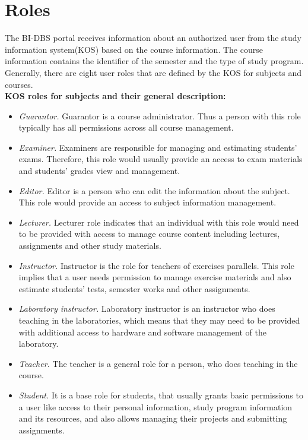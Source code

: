 \section{Roles} The BI-DBS portal receives information about an authorized user from the study information system(KOS) based on the course information. The course information contains the identifier of the semester and the type of study program. Generally, there are eight user roles that are defined by the KOS for subjects and courses.\\

\noindent \textbf{KOS roles for subjects and their general description:}

\begin{itemize}
    \item \emph{Guarantor.} Guarantor is a course administrator. Thus a person with this role typically has all permissions across all course management.
    \item \emph{Examiner.} Examiners are responsible for managing and estimating students' exams. Therefore, this role would usually provide an access to exam materials and students' grades view and management.
    \item \emph{Editor.} Editor is a person who can edit the information about the subject. This role would provide an access to subject information management.
    \item \emph{Lecturer.} Lecturer role indicates that an individual with this role would need to be provided with access to manage course content including lectures, assignments and other study materials.
    \item \emph{Instructor.} Instructor is the role for teachers of exercises parallels. This role implies that a user needs permission to manage exercise materials and also estimate students' tests, semester works and other assignments.
    \item \emph{Laboratory instructor.} Laboratory instructor is an instructor who does teaching in the laboratories, which means that they may need to be provided with additional access to hardware and software management of the laboratory.
    \item \emph{Teacher.} The teacher is a general role for a person, who does teaching in the course. 
    \item \emph{Student.} It is a base role for students, that usually grants basic permissions to a user like access to their personal information, study program information and its resources, and also allows managing their projects and submitting assignments.
\end{itemize}

